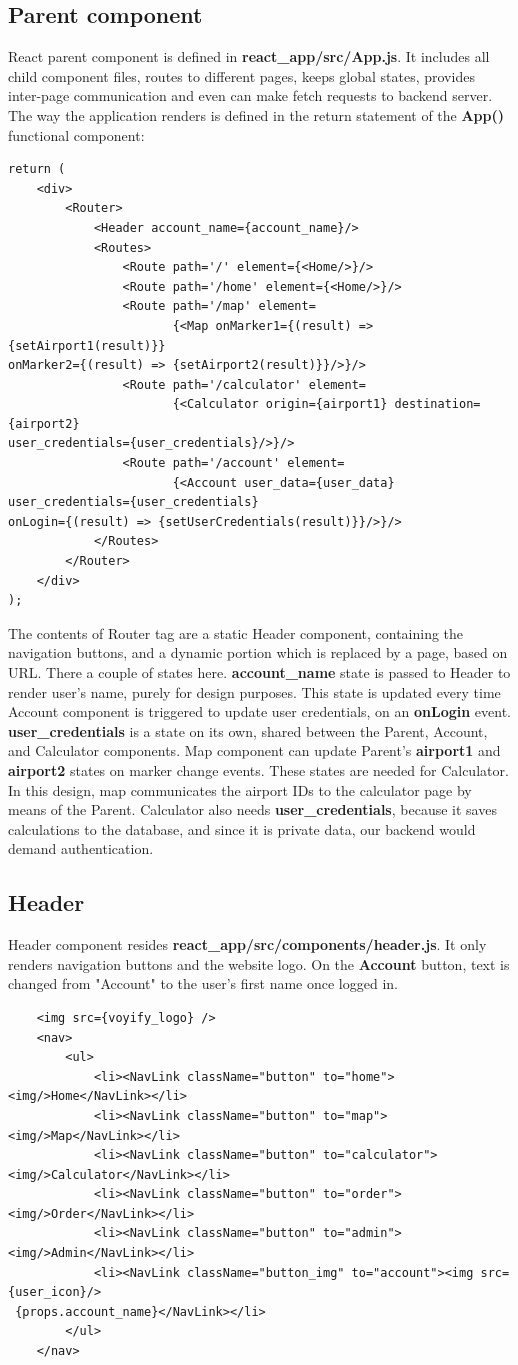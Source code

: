 \documentclass[12pt]{article}
\begin{document}
\subsection{Parent component}
\label{sec:org5154127}
React parent component is defined in \textbf{react\_app/src/App.js}. It includes all child component files, routes to different pages, keeps global states, provides inter-page communication and even can make fetch requests to backend server. The way the application renders is defined in the return statement of the \textbf{App()} functional component:
\begin{verbatim}
return (
	<div>
		<Router>
			<Header account_name={account_name}/>
			<Routes>
				<Route path='/' element={<Home/>}/>
				<Route path='/home' element={<Home/>}/>
				<Route path='/map' element=
					   {<Map onMarker1={(result) => {setAirport1(result)}} 
onMarker2={(result) => {setAirport2(result)}}/>}/>
				<Route path='/calculator' element=
					   {<Calculator origin={airport1} destination={airport2} 
user_credentials={user_credentials}/>}/>
				<Route path='/account' element=
					   {<Account user_data={user_data} user_credentials={user_credentials} 
onLogin={(result) => {setUserCredentials(result)}}/>}/>
			</Routes>
		</Router>
	</div>
);
\end{verbatim}
The contents of Router tag are a static Header component, containing the navigation buttons, and a dynamic portion which is replaced by a page, based on URL. There a couple of states here. \textbf{account\_name} state is passed to Header to render user's name, purely for design purposes. This state is updated every time Account component is triggered to update user credentials, on an \textbf{onLogin} event. \textbf{user\_credentials} is a state on its own, shared between the Parent, Account, and Calculator components. Map component can update Parent's \textbf{airport1} and \textbf{airport2} states on marker change events. These states are needed for Calculator. In this design, map communicates the airport IDs to the calculator page by means of the Parent. Calculator also needs \textbf{user\_credentials}, because it saves calculations to the database, and since it is private data, our backend would demand authentication.
\subsection{Header}
\label{sec:orgc6cea45}
Header component resides \textbf{react\_app/src/components/header.js}. It only renders navigation buttons and the website logo. On the \textbf{Account} button, text is changed from "Account" to the user's first name once logged in.
\begin{verbatim}
	<img src={voyify_logo} />
	<nav>
		<ul>
			<li><NavLink className="button" to="home"><img/>Home</NavLink></li>
			<li><NavLink className="button" to="map"><img/>Map</NavLink></li>
			<li><NavLink className="button" to="calculator"><img/>Calculator</NavLink></li>
			<li><NavLink className="button" to="order"><img/>Order</NavLink></li>
			<li><NavLink className="button" to="admin"><img/>Admin</NavLink></li>
			<li><NavLink className="button_img" to="account"><img src={user_icon}/>
 {props.account_name}</NavLink></li>
		</ul>
	</nav>
\end{verbatim}
\end{document}
